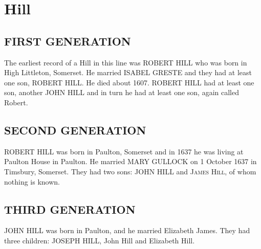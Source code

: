 \section{Hill}

\subsection{FIRST GENERATION}

The earliest record of a Hill in this line was \uppercase{Robert Hill} who was born in High Littleton, Somerset. He married \uppercase{Isabel Greste} and they had at least one son, \uppercase{Robert Hill}. He died about 1607.
\uppercase{Robert Hill} had at least one son, another \uppercase{John Hill} and in turn he had at least one son, again called Robert.

\subsection{SECOND GENERATION}

\uppercase{Robert Hill} was born in Paulton, Somerset and in 1637 he was living at Paulton House in Paulton. He married \uppercase{Mary Gullock} on 1 October 1637 in Timsbury, Somerset.  They had two sons: \uppercase{John Hill} and \textsc{James Hill}, of whom nothing is known.

\subsection{THIRD GENERATION}

\uppercase{John Hill} was born in Paulton, and he married Elizabeth James.  They had three children: \uppercase{Joseph Hill}, John Hill and Elizabeth Hill.

